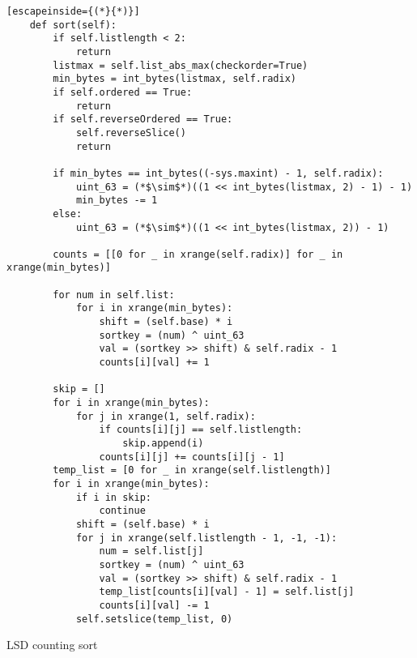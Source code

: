 \documentclass[12pt]{article}
\begin{document}
\begin{table}[H]
	\lstset{
		language=python,
    numbers=left,
    stepnumber=1,
    showstringspaces=false,
    tabsize=3,
    breaklines=true,
    breakatwhitespace=false,}
	\centering
	\begin{lstlisting}[escapeinside={(*}{*)}]
	def sort(self):
		if self.listlength < 2:
			return
		listmax = self.list_abs_max(checkorder=True)
		min_bytes = int_bytes(listmax, self.radix)
		if self.ordered == True:
			return
		if self.reverseOrdered == True:
			self.reverseSlice()
			return

		if min_bytes == int_bytes((-sys.maxint) - 1, self.radix):
			uint_63 = (*$\sim$*)((1 << int_bytes(listmax, 2) - 1) - 1)
			min_bytes -= 1
		else:
			uint_63 = (*$\sim$*)((1 << int_bytes(listmax, 2)) - 1)

		counts = [[0 for _ in xrange(self.radix)] for _ in xrange(min_bytes)]

		for num in self.list:
			for i in xrange(min_bytes):
				shift = (self.base) * i
				sortkey = (num) ^ uint_63
				val = (sortkey >> shift) & self.radix - 1
				counts[i][val] += 1

		skip = []
		for i in xrange(min_bytes):
			for j in xrange(1, self.radix):
				if counts[i][j] == self.listlength:
					skip.append(i)
				counts[i][j] += counts[i][j - 1]
		temp_list = [0 for _ in xrange(self.listlength)]
		for i in xrange(min_bytes):
			if i in skip:
				continue
			shift = (self.base) * i
			for j in xrange(self.listlength - 1, -1, -1):
				num = self.list[j]
				sortkey = (num) ^ uint_63
				val = (sortkey >> shift) & self.radix - 1
				temp_list[counts[i][val] - 1] = self.list[j]
				counts[i][val] -= 1
			self.setslice(temp_list, 0)
	\end{lstlisting}
	\caption*{LSD counting sort}
\end{table}
\end{document}
